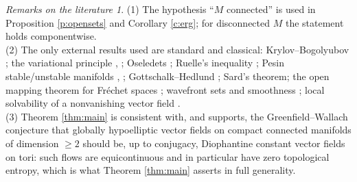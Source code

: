 \documentclass[11pt]{amsart}
\theoremstyle{plain}
\theoremstyle{definition}
\theoremstyle{remark}
\newtheorem*{remarks}{Remarks on the literature}
\begin{document}
\begin{remarks}
(1) The hypothesis ``$M$ connected'' is used in Proposition
\ref{p:opensets} and Corollary \ref{c:erg}; for disconnected $M$ the
statement holds componentwise.\\
(2) The only external results used are standard and classical:
Krylov--Bogolyubov \cite[4.1.1]{Walters}; the variational principle
\cite{Goodman}, \cite{KH}; Oseledets \cite{Oseledets}; Ruelle's
inequality \cite{RuelleIneq}; Pesin stable/unstable manifolds
\cite{Pesin}, \cite{KatokHasselblattPES}; Gottschalk--Hedlund
\cite{GH}; Sard's theorem; the open mapping theorem for Fr\'echet
spaces \cite{HorLA}; wavefront sets and smoothness
\cite{Hor1}; local solvability of a nonvanishing vector field
\cite{Hor4}.\\
(3) Theorem \ref{thm:main} is consistent with, and supports, the
Greenfield--Wallach conjecture \cite{GW} that globally hypoelliptic
vector fields on compact connected manifolds of dimension $\ge2$
should be, up to conjugacy, Diophantine constant vector fields on
tori: such flows are equicontinuous and in particular have zero
topological entropy, which is what Theorem \ref{thm:main} asserts
in full generality.
\end{remarks}
\end{document}
